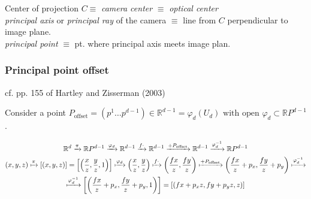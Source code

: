 \documentclass[10pt]{amsart}
\begin{document}
\begin{multicols*}{2}
Center of projection $C \equiv $ \emph{camera center} $\equiv$ \emph{optical center}  \\
\emph{principal axis} or \emph{principal ray} of the camera $\equiv$ line from $C$ perpendicular to image plane.  \\
\emph{principal point} $\equiv $ pt. where principal axis meets image plan.  

\subsubsection{Principal point offset} cf. pp. 155 of Hartley and Zisserman (2003) \cite{HaZi2003}

Consider a point $P_{\text{offset}} = (p^1 \dots p^{d-1}) \in \mathbb{R}^{d-1} = \varphi_d(U_d) \text{ with open } \varphi_d \subset \mathbb{R}P^{d-1}$.  

\begin{equation}
\begin{gathered}
	\mathbb{R}^d \xrightarrow{ \pi } \mathbb{R}P^{d-1} \xrightarrow{ \varphi_d  } \mathbb{R}^{d-1}  \xrightarrow{ f\cdot } \mathbb{R}^{d-1} \xrightarrow{ + P_{\text{offset}} } \mathbb{R}^{d-1} \xrightarrow{ \varphi_d^{-1} } \mathbb{R}P^{d-1}  \\
\begin{gathered}
(x,y,z) \xmapsto{ \pi } [(x,y,z)] = \left[ \left( \frac{x}{z}, \frac{y}{z},1 \right) \right] \xmapsto{ \varphi_d }  \left( \frac{x}{z} , \frac{y}{z} \right) \xmapsto{ f\cdot } \left( \frac{fx}{z} , \frac{fy}{z} \right) \xmapsto{ + P_{\text{offset}} } \left( \frac{fx}{z} + p_x,  \frac{fy}{z} + p_y \right) \xmapsto{ \varphi_d^{-1}} \\
 \xmapsto{ \varphi_d^{-1}} \left[ \left( \frac{fx}{z} + p_x , \frac{fy}{z} + p_y ,1\right) \right] = \left[ (fx+p_xz, fy+p_yz, z) \right]
\end{gathered}
\end{gathered}
\end{equation}


\end{multicols*}
\end{document}
